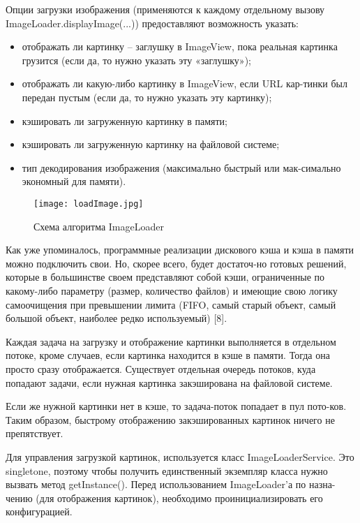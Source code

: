 Опции загрузки изображения (применяются к каждому отдельному вызову ImageLoader.displayImage(...)) предоставляют возможность указать:

\begin{itemize}	
	\item отображать ли картинку – заглушку в ImageView, пока реальная картинка грузится (если да, то нужно указать эту «заглушку»);
	\item отображать ли какую-либо картинку в ImageView, если URL кар-тинки был передан пустым (если да, то нужно указать эту картинку); 
	\item кэшировать ли загруженную картинку в памяти;
	\item кэшировать ли загруженную картинку на файловой системе;
	\item тип декодирования изображения (максимально быстрый или мак-симально экономный для памяти).
\end{itemize}


\begin{figure}[!htb]
			\centering
			\texttt{[image: loadImage.jpg]}
			\caption{ Схема алгоритма ImageLoader }
			\label{fig:arch_and_mod:ImageLoader}
\end{figure}

Как уже упоминалось, программные реализации дискового кэша и кэша в памяти можно подключить свои. Но, скорее всего, будет достаточ-но готовых решений, которые в большинстве своем представляют собой кэши, ограниченные по какому-либо параметру (размер, количество файлов) и имеющие свою логику самоочищения при превышении лимита (FIFO, самый старый объект, самый большой объект, наиболее редко используемый) [8].


Каждая задача на загрузку и отображение картинки выполняется в отдельном потоке, кроме случаев, если картинка находится в кэше в памяти. Тогда она просто сразу отображается. Существует отдельная очередь потоков, куда попадают задачи, если нужная картинка закэширована на файловой системе. 

Если же нужной картинки нет в кэше, то задача-поток попадает в пул пото-ков. Таким образом, быстрому отображению закэшированных картинок ничего не препятствует.

Для управления загрузкой картинок, используется класс ImageLoaderService. Это singletone, поэтому чтобы получить единственный экземпляр класса нужно вызвать метод getInstance(). Перед использованием ImageLoader'а по назна-чению (для отображения картинок), необходимо проинициализировать его конфигурацией.

